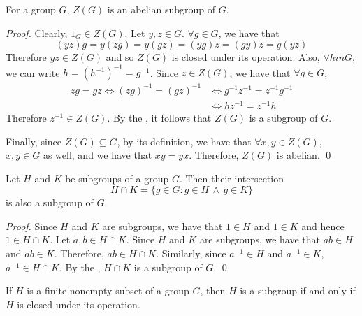 \begin{eg}
  For a group $G$, $Z(G)$ is an abelian subgroup of $G$.

  \begin{proof}
    Clearly, $1_G \in Z(G)$. Let $y, z \in G$. $\forall g \in G$, we have that
    \begin{equation*}
      (yz)g = y(zg) = y(gz) = (yg)z = (gy)z = g(yz)
    \end{equation*}
    Therefore $yz \in Z(G)$ and so $Z(G)$ is closed under its operation. Also, $\forall h 
    in G$, we can write $h = (h^{-1})^{-1} = g^{-1}$. Since $z \in Z(G)$, we have that $\forall g \in G$,
    \begin{align*}
      zg = gz \iff (zg)^{-1} = (gz)^{-1} &\iff g^{-1} z^{-1} = z^{-1} g^{-1} \\
          &\iff hz^{-1} = z^{-1} h
    \end{align*}
    Therefore $z^{-1} \in Z(G)$. By the , it follows that $Z(G)$ is a subgroup of $G$.

    Finally, since $Z(G) \subseteq G$, by its definition, we have that $\forall x, y \in Z(G)$, $x, y \in G$ as well, and we have that $xy = yx$. Therefore, $Z(G)$ is abelian. \qed
  \end{proof}
\end{eg}

\begin{propo}\label{propo:intersection_of_subgroups_is_a_subgroup}
  Let $H$ and $K$ be subgroups of a group $G$. Then their intersection
  \begin{equation*}
    H \cap K = \{g \in G : g \in H \, \land \, g \in K\}
  \end{equation*}
  is also a subgroup of $G$.
\end{propo}

\begin{proof}
  Since $H$ and $K$ are subgroups, we have that $1 \in H$ and $1 \in K$ and hence $1 \in H \cap K$. Let $a, b \in H \cap K$. Since $H$ and $K$ are subgroups, we have that $ab \in H$ and $ab \in K$. Therefore, $ab \in H \cap K$. Similarly, since $a^{-1} \in H$ and $a^{-1} \in K$, $a^{-1} \in H \cap K$. By the , $H \cap K$ is a subgroup of $G$. \qed
\end{proof}

\begin{propo}\label{propo:finite_subgroup_test}
  If $H$ is a finite nonempty subset of a group $G$, then $H$ is a subgroup if and only if $H$ is closed under its operation.
\end{propo}

